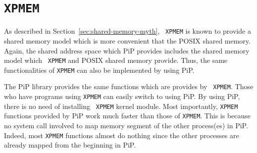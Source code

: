 
\section{{\tt XPMEM}}\label{sec:xpmem}

As described in Section~\ref{sec:shared-memory-myth}, {\tt
  XPMEM} is known to provide a shared memory model which is more
convenient that the POSIX shared memory. Again, the shared address
space which PiP provides includes the shared memory model which {\tt
  XPMEM} and POSIX shared memory provide. Thus, the same
functionalities of {\tt XPMEM} can also be implemented by using PiP.

The PiP library provides the same functions which are provides by {\tt
  XPMEM}.  Those who have programs using {\tt XPMEM} can easily switch
to using PiP.  By using PiP, there is no need of installing {\tt
  XPMEM} kernel module. Most importantly, {\tt XPMEM} functions
provided by PiP work much faster than those of {\tt XPMEM}. This is
because no system call involved to map memory segment of the other
process(es) in PiP. Indeed, most {\tt XPMEM} functions almost do
nothing since the other processes are already mapped from the
beginning in PiP. 
